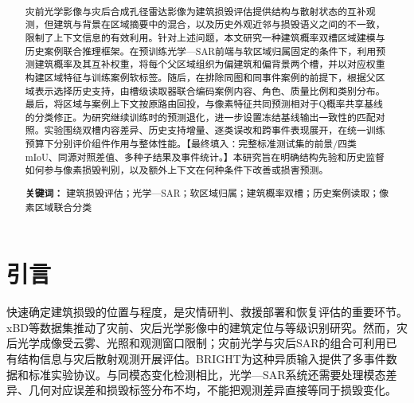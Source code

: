\documentclass[UTF8,a4paper,zihao=-4,fontset=none]{ctexart}
\title{\bfseries\zihao{2}\papertitle}
\author{\zihao{-4}\paperauthor\\[0.4em]{\small\paperinstitution}}
\date{}
\newif\ifdraftnotes
\begin{document}
\maketitle
\thispagestyle{plain}
\vspace{-1.3em}
\ifdraftnotes
  \begin{revisionnote}
  \textbf{修订稿说明（投稿前删除）：} 本稿依据2026年10月18日核查的 \texttt{joint\_anchor\_fresh\_chain\_v2} 及其依赖代码重写。它对应固定Q、建筑概率双槽、父区域Top64检索、像素—区域—历史案例残差联合分类。概率锚定KL是已实现但尚待完整验证的候选训练策略。本稿不将旧版69.64\%的四类Test mIoU归给新方法，所有新版本尚未完成的成绩均以``待测''表示。第IV节包含可直接填数的实验表和分析段落；其中拟补实验不能在最终论文中写成已经执行。原图不在本稿重画，图位和图注按新方法给出，逐图改动详见配套说明。
  \end{revisionnote}
\fi
\begin{abstract}
灾前光学影像与灾后合成孔径雷达影像为建筑损毁评估提供结构与散射状态的互补观测，但建筑与背景在区域摘要中的混合，以及历史外观近邻与损毁语义之间的不一致，限制了上下文信息的有效利用。针对上述问题，本文研究一种建筑概率双槽区域建模与历史案例联合推理框架。在预训练光学—SAR前端与软区域归属固定的条件下，利用预测建筑概率及其互补权重，将每个父区域组织为偏建筑和偏背景两个槽，并以对应权重构建区域特征与训练案例软标签。随后，在排除同图和同事件案例的前提下，根据父区域表示选择历史支持，由槽级读取器联合编码案例内容、角色、质量比例和类别分布。最后，将区域与案例上下文按原路由回投，与像素特征共同预测相对于Q概率共享基线的分类修正。为研究继续训练时的预测退化，进一步设置冻结基线输出一致性的匹配对照。实验围绕双槽内容差异、历史支持增量、逐类误改和跨事件表现展开，在统一训练预算下分别评价组件作用与整体性能。【最终填入：完整标准测试集的前景/四类mIoU、同源对照差值、多种子结果及事件统计。】本研究旨在明确结构先验和历史监督如何参与像素损毁判别，以及额外上下文在何种条件下改善或损害预测。
\par\medskip\noindent\textbf{关键词：} 建筑损毁评估；光学—SAR；软区域归属；建筑概率双槽；历史案例读取；像素区域联合分类
\end{abstract}
\section{引言}

\label{sec:introduction}

快速确定建筑损毁的位置与程度，是灾情研判、救援部署和恢复评估的重要环节。xBD等数据集推动了灾前、灾后光学影像中的建筑定位与等级识别研究\cite{ref1}。然而，灾后光学成像受云雾、光照和观测窗口限制；灾前光学与灾后SAR的组合可利用已有结构信息与灾后散射观测开展评估。BRIGHT为这种异质输入提供了多事件数据和标准实验协议\cite{ref2}。与同模态变化检测相比，光学—SAR系统还需要处理模态差异、几何对应误差和损毁标签分布不均，不能把观测差异直接等同于损毁变化。
\end{document}

